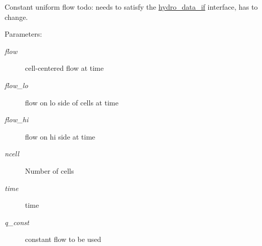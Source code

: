 Constant uniform flow todo: needs to satisfy the \hyperlink{a00034}{hydro\_\-data\_\-if} interface, has to change. 

\begin{Desc}
\item[Parameters:]
\begin{description}
\item[{\em flow}]cell-centered flow at time\item[{\em flow\_\-lo}]flow on lo side of cells at time\item[{\em flow\_\-hi}]flow on hi side at time\item[{\em ncell}]Number of cells\item[{\em time}]time\item[{\em q\_\-const}]constant flow to be used \end{description}
\end{Desc}
